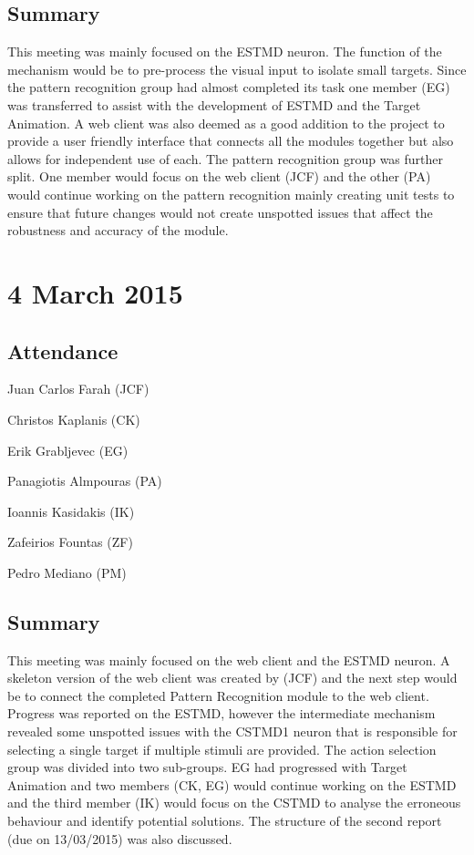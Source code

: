 \documentclass[a4paper,11pt]{article}
\begin{document}
\subsection*{Summary}
This meeting was mainly focused on the ESTMD neuron. The function of the mechanism would be to pre-process the visual input to isolate small targets. Since the pattern recognition group had almost completed its task one member (EG) was transferred to assist with the development of ESTMD and the Target Animation. A web client was also deemed as a good addition to the project to provide a user friendly interface that connects all the modules together but also allows for independent use of each. The pattern recognition group was further split. One member would focus on the web client (JCF) and the other (PA) would continue working on the pattern recognition mainly creating unit tests to ensure that future changes would not create unspotted issues that affect the robustness and accuracy of the module.

\maketitle
\section*{4 March 2015}
\subsection*{Attendance}
\begin{compactenum}
\item Juan Carlos Farah (JCF)
\item Christos Kaplanis (CK)
\item Erik Grabljevec (EG)
\item Panagiotis Almpouras (PA)
\item Ioannis Kasidakis (IK)
\item Zafeirios Fountas (ZF)
\item Pedro Mediano (PM)
\end{compactenum}

\subsection*{Summary}
This meeting was mainly focused on the web client and the ESTMD neuron. A skeleton version of the web client was created by (JCF) and the next step would be to connect the completed Pattern Recognition module to the web client. Progress was reported on the ESTMD, however the intermediate mechanism revealed some unspotted issues with the CSTMD1 neuron that is responsible for selecting a single target if multiple stimuli are provided. The action selection group was divided into two sub-groups. EG had progressed with Target Animation and two members (CK, EG) would continue working on the ESTMD and the third member (IK) would focus on the CSTMD to analyse the erroneous behaviour and identify potential solutions. The structure of the second report (due on 13/03/2015) was also discussed.
\end{document}
